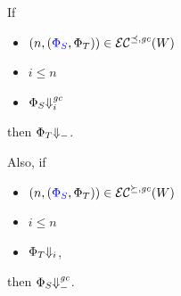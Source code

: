 \documentclass[a4paper]{article}
\begin{document}
\begin{lemma}
  \label{lem:adequacy}
  If
  \begin{itemize}
  \item $\npair{\stpair{\Phi}{\Phi}}\in\lrec[\preceq,\gc](W)$
  \item $i \leq n$
  \item $\Phi_S \sterm[i]{\gc}$
  \end{itemize}
  then $\Phi_T\term$.

  Also, if
  \begin{itemize}
  \item $\npair{\stpair{\Phi}{\Phi}}\in\lrec[\succeq,\gc](W)$
  \item $i \leq n$
  \item $\Phi_T \term[i]$,
  \end{itemize}
  then $\Phi_S\sterm{\gc}$.
\end{lemma}
\end{document}
